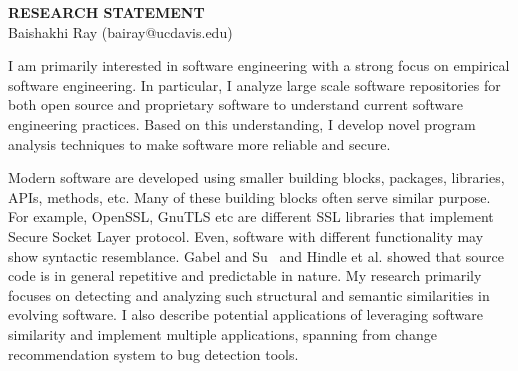 \documentclass[a4paper, 10pt]{article}
\begin{document}
\thispagestyle{fancy}
\lhead{}
\rhead{}


\pagestyle{fancy}
\rhead{\grayline{\thepage/\totalpages{}}}

\begin{small}

\begin{center}
{\large \bf RESEARCH STATEMENT}\\
\vspace*{0.1cm}
{\normalsize Baishakhi Ray (bairay@ucdavis.edu)}
\end{center}


I am primarily interested in software engineering with a strong focus on empirical software engineering.
In particular, I analyze large scale software repositories for both open source and proprietary software to 
understand current software engineering practices. Based on this understanding, I develop novel program 
analysis techniques to make software more reliable and secure.

Modern software are developed using smaller building blocks, \eg  packages, libraries, APIs, methods, etc. 
Many of these building blocks often serve similar purpose. For example, OpenSSL, GnuTLS etc are 
different SSL libraries that implement Secure Socket Layer protocol. Even, software with different functionality 
may show syntactic resemblance. Gabel and Su~\cite{Gabel2010:uniqueness} and Hindle et al.\cite{Hindle:2012} 
showed that source code is in general repetitive and predictable in nature. My research primarily focuses on 
detecting and analyzing such structural and semantic similarities in evolving software. I also describe potential 
applications of leveraging software similarity and implement multiple applications, spanning from change 
recommendation system to bug detection tools. 



\end{small}
\end{document}
